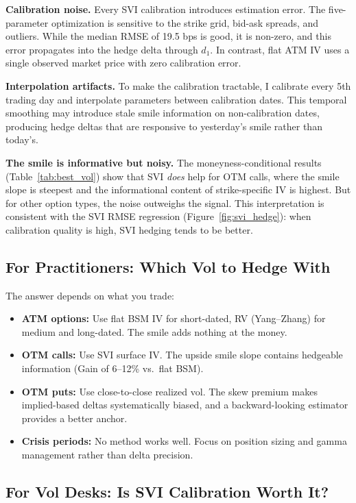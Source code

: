 \documentclass[12pt, letterpaper]{article}
\begin{document}
\textbf{Calibration noise.} Every SVI calibration introduces estimation error. The five-parameter optimization is sensitive to the strike grid, bid-ask spreads, and outliers. While the median RMSE of 19.5 bps is good, it is non-zero, and this error propagates into the hedge delta through $d_1$. In contrast, flat ATM IV uses a single observed market price with zero calibration error.

\textbf{Interpolation artifacts.} To make the calibration tractable, I calibrate every 5th trading day and interpolate parameters between calibration dates. This temporal smoothing may introduce stale smile information on non-calibration dates, producing hedge deltas that are responsive to yesterday's smile rather than today's.

\textbf{The smile is informative but noisy.} The moneyness-conditional results (Table~\ref{tab:best_vol}) show that SVI \textit{does} help for OTM calls, where the smile slope is steepest and the informational content of strike-specific IV is highest. But for other option types, the noise outweighs the signal. This interpretation is consistent with the SVI RMSE regression (Figure~\ref{fig:svi_hedge}): when calibration quality is high, SVI hedging tends to be better.

\subsection{For Practitioners: Which Vol to Hedge With}

The answer depends on what you trade:

\begin{itemize}
    \item \textbf{ATM options:} Use flat BSM IV for short-dated, RV (Yang--Zhang) for medium and long-dated. The smile adds nothing at the money.
    \item \textbf{OTM calls:} Use SVI surface IV. The upside smile slope contains hedgeable information (Gain of 6--12\% vs.\ flat BSM).
    \item \textbf{OTM puts:} Use close-to-close realized vol. The skew premium makes implied-based deltas systematically biased, and a backward-looking estimator provides a better anchor.
    \item \textbf{Crisis periods:} No method works well. Focus on position sizing and gamma management rather than delta precision.
\end{itemize}

\subsection{For Vol Desks: Is SVI Calibration Worth It?}
\end{document}
